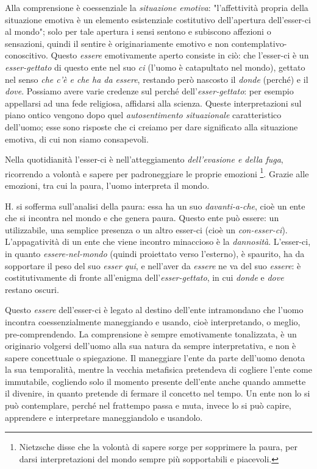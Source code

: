 \documentclass[a4paper,12pt,oneside]{article}%
\begin{document}
Alla comprensione è coessenziale la \textit{situazione emotiva}: "l'affettività propria della situazione emotiva è un elemento esistenziale costitutivo dell'apertura dell'esser-ci al mondo"; solo per tale apertura i sensi sentono e subiscono affezioni o sensazioni, quindi il sentire è originariamente emotivo e non contemplativo-conoscitivo. Questo \textit{essere} emotivamente aperto consiste in ciò: che l'esser-ci è un \textit{esser-gettato} di questo ente nel suo \textit{ci} (l'uomo è catapultato nel mondo), gettato nel senso \textit{che c'è e che ha da essere}, restando però nascosto il \textit{donde} (perché) e il \textit{dove}. Possiamo avere varie credenze sul perché dell'\textit{esser-gettato}: per esempio appellarsi ad una fede religiosa, affidarsi alla scienza. Queste interpretazioni sul piano ontico vengono dopo quel \textit{autosentimento situazionale} caratteristico dell'uomo; esse sono risposte che ci creiamo per dare significato alla situazione emotiva, di cui non siamo consapevoli.

Nella quotidianità l'esser-ci è nell'atteggiamento \textit{dell'evasione e della fuga}, ricorrendo a volontà e sapere per padroneggiare le proprie emozioni \footnote{Nietzsche disse che la volontà di sapere sorge per sopprimere la paura, per darsi interpretazioni del mondo sempre più sopportabili e piacevoli.}. Grazie alle emozioni, tra cui la paura, l'uomo interpreta il mondo.

H. si sofferma sull'analisi della paura: essa ha un suo \textit{davanti-a-che}, cioè un ente che si incontra nel mondo e che genera paura. Questo ente può essere: un utilizzabile, una semplice presenza o un altro esser-ci (cioè un \textit{con-esser-ci}). L'appagatività di un ente che viene incontro minaccioso è la \textit{dannosità}. L'esser-ci, in quanto \textit{essere-nel-mondo} (quindi proiettato verso l'esterno), è spaurito, ha da sopportare il peso del suo \textit{esser qui}, e nell'aver da \textit{essere} ne va del suo \textit{essere}: è costitutivamente di fronte all'enigma dell'\textit{esser-gettato}, in cui \textit{donde} e \textit{dove}  restano oscuri.

Questo \textit{essere} dell'esser-ci è legato al destino dell'ente intramondano che l'uomo incontra coessenzialmente maneggiando e usando, cioè interpretando, o meglio, pre-comprendendo. La comprensione è sempre emotivamente tonalizzata, è un originario volgersi dell'uomo alla sua natura da sempre interpretativa, e non è sapere concettuale o spiegazione. Il maneggiare l'ente da parte dell'uomo denota la sua temporalità, mentre la vecchia metafisica pretendeva di cogliere l'ente come immutabile, cogliendo solo il momento presente dell'ente anche quando ammette il divenire, in quanto pretende di fermare il concetto nel tempo. Un ente non lo si può contemplare, perché nel frattempo passa e muta, invece lo si può capire, apprendere e interpretare maneggiandolo e usandolo.
\end{document}
